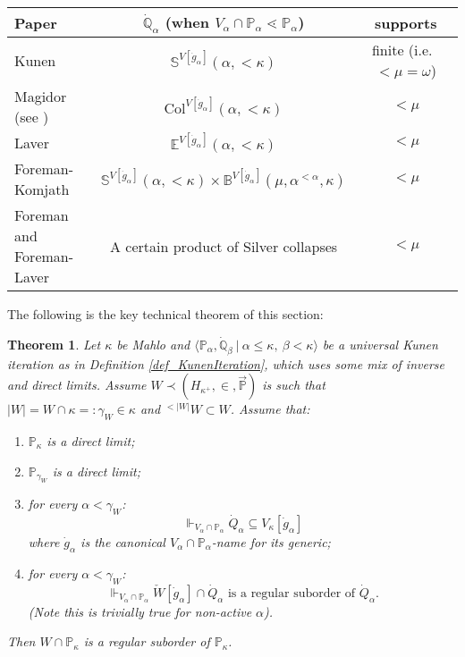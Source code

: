 \documentclass{amsart}
\newtheorem{theorem}{Theorem}
\begin{document}
\vspace{15pt}


\begin{tabular}{p{.20\linewidth}|c|c}
Paper &  $\dot{\mathbb{Q}}_\alpha$ (when $V_\alpha \cap \mathbb{P}_\alpha \lessdot \mathbb{P}_\alpha$) & supports \\
\hline
\hline
Kunen~\cite{MR495118}  & $\mathbb{S}^{V[\dot{g}_\alpha]}(\alpha, < \kappa)$ & finite (i.e.\ $<\mu = \omega$) \\
\hline
Magidor (see \cite{MattHandbook})  & $\text{Col}^{V[\dot{g}_\alpha]}(\alpha, < \kappa)$ & $<\mu$ \\
\hline
Laver~\cite{MR673792}   & $\mathbb{E}^{V[\dot{g}_\alpha]}(\alpha, < \kappa)$ & $<\mu$  \\
\hline
Foreman-Komjath~\cite{MR2151585}  & $\mathbb{S}^{V[\dot{g}_\alpha]}(\alpha, < \kappa) \times \mathbb{B}^{V[\dot{g}_\alpha]}(\mu, \alpha^{<\alpha}, \kappa)$ & $<\mu$ \\
\hline
Foreman~\cite{MR730584} and Foreman-Laver~\cite{MR925267}   &  A certain product of Silver collapses  & $<\mu$ \\
\hline
\end{tabular}

\vspace{15pt}





The following is the key technical theorem of this section:
\begin{theorem}\label{thm_MainTheorem}
Let $\kappa$ be Mahlo and $\langle \mathbb{P}_\alpha, \dot{\mathbb{Q}}_\beta \ | \ \alpha \le \kappa, \ \beta < \kappa \rangle$ be a universal Kunen iteration as in Definition \ref{def_KunenIteration}, which uses some mix of inverse and direct limits.  Assume $W \prec (H_{\kappa^+}, \in, \vec{\mathbb{P}})$ is such that $|W|=W \cap \kappa =: \gamma_W \in \kappa$ and ${}^{<|W|} W \subset W$.  Assume that:
\begin{enumerate}
 \item $\mathbb{P}_\kappa$ is a direct limit;
 \item $\mathbb{P}_{\gamma_W}$ is a direct limit;
 \item\label{item_ConditionsInVkappa} for every $\alpha < \gamma_W$:
\begin{equation*}
\Vdash_{V_\alpha \cap \mathbb{P}_\alpha} \dot{Q}_\alpha \subseteq V_\kappa[\dot{g}_\alpha]
\end{equation*}
where $\dot{g}_\alpha$ is the canonical $V_\alpha \cap \mathbb{P}_\alpha$-name for its generic;

  \item\label{item_ReductionInNextStep} for every $\alpha < \gamma_W$:
\begin{equation*}
\Vdash_{V_\alpha\cap \mathbb{P}_\alpha} \check{W}[\dot{g}_\alpha] \cap \dot{Q}_\alpha \text{ is a regular suborder of } \dot{Q}_\alpha.   
\end{equation*}
(Note this is trivially true for non-active $\alpha$).
\end{enumerate}

Then $W \cap \mathbb{P}_\kappa$ is a regular suborder of $\mathbb{P}_\kappa$.  
\end{theorem}
\end{document}
